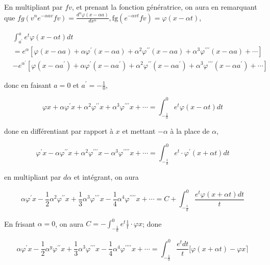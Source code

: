 \documentclass{article}
\begin{document}
En multipliant par \(f v\), et prenant la fonction génératrice, on aura en remarquant que \(f g\left(v^{n} e^{-\alpha a v} f v\right)=\frac{d^{n} \varphi(x-\alpha a)}{d x^{n}}, \mathrm{fg}\left(e^{-\alpha v t} f v\right)=\varphi(x-\alpha t)\),

\[
\begin{aligned}
& \int_{a^{\prime}}^{a} e^{t} \varphi(x-\alpha t) d t \\
& =e^{\alpha}\left[\varphi(x-\alpha a)+\alpha \varphi^{\prime}(x-\alpha a)+\alpha^{2} \varphi^{\prime \prime}(x-\alpha a)+\alpha^{3} \varphi^{\prime \prime \prime}(x-\alpha a)+\cdots\right] \\
& -e^{\alpha^{\prime}}\left[\varphi\left(x-\alpha a^{\prime}\right)+\alpha \varphi^{\prime}\left(x-\alpha a^{\prime}\right)+\alpha^{2} \varphi^{\prime \prime}\left(x-\alpha a^{\prime}\right)+\alpha^{3} \varphi^{\prime \prime \prime}\left(x-\alpha a^{\prime}\right)+\cdots\right]
\end{aligned}
\]

donc en faisant \(a=0\) et \(a^{\prime}=-\frac{1}{0}\),

\[
\varphi x+\alpha \varphi^{\prime} x+\alpha^{2} \varphi^{\prime \prime} x+\alpha^{3} \varphi^{\prime \prime \prime} x+\cdots=\int_{-\frac{1}{0}}^{0} e^{t} \varphi(x-\alpha t) d t
\]

done en différentiant par rapport à \(x\) et mettant \(-\alpha\) à la place de \(\alpha\),

\[
\varphi^{\prime} x-\alpha \varphi^{\prime \prime} x+\alpha^{2} \varphi^{\prime \prime \prime} x-\alpha^{3} \varphi^{\prime \prime \prime \prime} x+\cdots=\int_{-\frac{1}{0}}^{0} e^{t} \cdot \varphi^{\prime}(x+\alpha t) d t
\]

en multipliant par \(d \alpha\) et intégrant, on aura

\[
\alpha \varphi^{\prime} x-\frac{1}{2} \alpha^{2} \varphi^{\prime \prime} x+\frac{1}{3} \alpha^{3} \varphi^{\prime \prime \prime} x-\frac{1}{4} \alpha^{4} \varphi^{\prime \prime \prime \prime} x+\cdots=C+\int_{-\frac{1}{0}}^{0} \frac{e^{t} \varphi(x+\alpha t) d t}{t}
\]

En frisant \(\alpha=0\), on aura \(C=-\int_{-\frac{1}{0}}^{0} e^{t} \frac{1}{t} \cdot \varphi x\); done

\[
\alpha \varphi^{\prime} x-\frac{1}{2} \alpha^{y} \varphi^{\prime \prime} x+\frac{1}{3} \alpha^{3} \varphi^{\prime \prime \prime} x-\frac{1}{4} \alpha^{4} \varphi^{\prime \prime \prime \prime} x+\cdots=\int_{-\frac{1}{0}}^{0} \frac{e^{t} d t}{t}[\varphi(x+\alpha t)-\varphi x\rceil
\]
\end{document}
